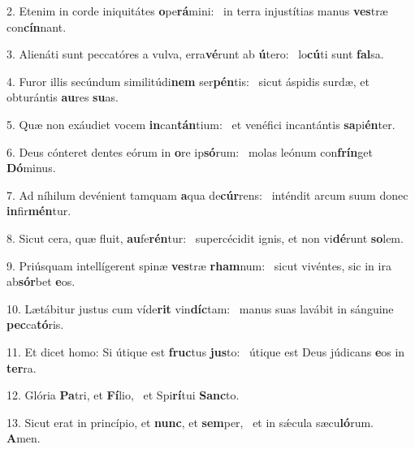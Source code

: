2. Etenim in corde iniquitátes \textbf{o}pe\textbf{rá}mini: \ast\  in terra injustítias manus \textbf{ves}træ con\textbf{cín}nant.\

3. Alienáti sunt peccatóres a vulva, erra\textbf{vé}runt ab \textbf{ú}tero: \ast\  lo\textbf{cú}ti sunt \textbf{fal}sa.\

4. Furor illis secúndum similitúdi\textbf{nem} ser\textbf{pén}tis: \ast\  sicut áspidis surdæ, et obturántis \textbf{au}res \textbf{su}as.\

5. Quæ non exáudiet vocem \textbf{in}can\textbf{tán}tium: \ast\  et venéfici incantántis \textbf{sa}pi\textbf{én}ter.\

6. Deus cónteret dentes eórum in \textbf{o}re ip\textbf{só}rum: \ast\  molas leónum con\textbf{frín}get \textbf{Dó}minus.\

7. Ad níhilum devénient tamquam \textbf{a}qua de\textbf{cúr}rens: \ast\  inténdit arcum suum donec \textbf{in}fir\textbf{mén}tur.\

8. Sicut cera, quæ fluit, \textbf{au}fe\textbf{rén}tur: \ast\  supercécidit ignis, et non vi\textbf{dé}runt \textbf{so}lem.\

9. Priúsquam intellígerent spinæ \textbf{ves}træ \textbf{rham}num: \ast\  sicut vivéntes, sic in ira ab\textbf{sór}bet \textbf{e}os.\

10. Lætábitur justus cum víde\textbf{rit} vin\textbf{díc}tam: \ast\  manus suas lavábit in sánguine \textbf{pec}ca\textbf{tó}ris.\

11. Et dicet homo: Si útique est \textbf{fruc}tus \textbf{jus}to: \ast\  útique est Deus júdicans \textbf{e}os in \textbf{ter}ra.\

12. Glória \textbf{Pa}tri, et \textbf{Fí}lio, \ast\  et Spi\textbf{rí}tui \textbf{Sanc}to.\

13. Sicut erat in princípio, et \textbf{nunc}, et \textbf{sem}per, \ast\  et in sǽcula sæcu\textbf{ló}rum. \textbf{A}men.\

